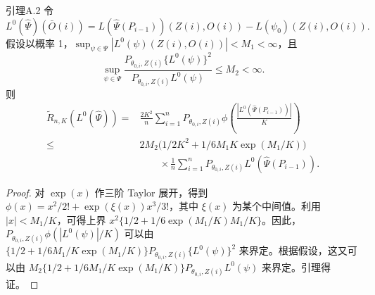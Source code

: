\begin{bookresult}{引理}{A.2}
令
\[
L^0(\widehat\Psi)(\bar O(i))
 =L(\widehat\Psi(P_{i-1}))(Z(i),O(i))-L(\psi_0)(Z(i),O(i)).
\]
假设以概率 1，$\sup_{\psi\in\Psi}|L^0(\psi)(Z(i),O(i))|<M_1<\infty$，且
\[
\sup_{\psi\in\Psi}
 \frac{P_{\theta_{0,i},Z(i)}\{L^0(\psi)\}^2}
 {P_{\theta_{0,i},Z(i)}L^0(\psi)}\le M_2<\infty.
\]
则
\[
\begin{aligned}
\widetilde R_{n,K}(L^0(\widehat\Psi))
={}&\frac{2K^2}{n}\sum_{i=1}^nP_{\theta_{0,i},Z(i)}
 \phi\left(\frac{|L^0(\widehat\Psi(P_{i-1}))|}{K}\right)\\
\le{}&2M_2\bigl(1/2K^2+1/6M_1K\exp(M_1/K)\bigr)\\
&\qquad\times\frac1n\sum_{i=1}^nP_{\theta_{0,i},Z(i)}L^0(\widehat\Psi(P_{i-1})).
\end{aligned}
\]
\end{bookresult}

\begin{proof}
对 $\exp(x)$ 作三阶 Taylor 展开，得到
$\phi(x)=x^2/2!+\exp(\xi(x))x^3/3!$，其中 $\xi(x)$ 为某个中间值。利用 $|x|<M_1/K$，可得上界
$x^2\{1/2+1/6\exp(M_1/K)M_1/K\}$。因此，
$P_{\theta_{0,i},Z(i)}\phi(|L^0(\psi)|/K)$
可以由
$\{1/2+1/6M_1/K\exp(M_1/K)\}P_{\theta_{0,i},Z(i)}\{L^0(\psi)\}^2$
来界定。根据假设，这又可以由
$M_2\{1/2+1/6M_1/K\exp(M_1/K)\}P_{\theta_{0,i},Z(i)}L^0(\psi)$
来界定。引理得证。
\end{proof}
